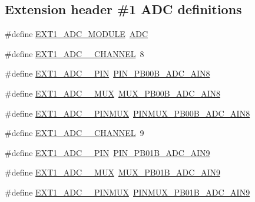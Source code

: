 \subsection*{Extension header \#1 A\+DC definitions}
\begin{DoxyCompactItemize}
\item 
\#define \mbox{\hyperlink{group__samd21__xplained__pro__features__group_gab83ec879d6e7b5c444f1040cc66f6dee}{E\+X\+T1\+\_\+\+A\+D\+C\+\_\+\+M\+O\+D\+U\+LE}}~\mbox{\hyperlink{group___s_a_m_d21_j18_a__base_ga54d148b91f3d356713f7e367a2243bea}{A\+DC}}
\item 
\#define \mbox{\hyperlink{group__samd21__xplained__pro__features__group_ga7284b60a75f2e7da244ab23febb69ddc}{E\+X\+T1\+\_\+\+A\+D\+C\+\_\+\_\+\+C\+H\+A\+N\+N\+EL}}~8
\item 
\#define \mbox{\hyperlink{group__samd21__xplained__pro__features__group_ga646da6c87a60fb8f8961f877ce858f43}{E\+X\+T1\+\_\+\+A\+D\+C\+\_\+\_\+\+P\+IN}}~\mbox{\hyperlink{pio_2samd21j18a_8h_a908a9cac08dea9a27ed599cc49b6a93e}{P\+I\+N\+\_\+\+P\+B00\+B\+\_\+\+A\+D\+C\+\_\+\+A\+I\+N8}}
\item 
\#define \mbox{\hyperlink{group__samd21__xplained__pro__features__group_gabdc6ba9937a1050b8a40f8928d95fbc4}{E\+X\+T1\+\_\+\+A\+D\+C\+\_\+\_\+\+M\+UX}}~\mbox{\hyperlink{pio_2samd21j18a_8h_a71de17af729c0317dacad0605aed38b7}{M\+U\+X\+\_\+\+P\+B00\+B\+\_\+\+A\+D\+C\+\_\+\+A\+I\+N8}}
\item 
\#define \mbox{\hyperlink{group__samd21__xplained__pro__features__group_ga1724086d943789b79674a86857cb0fae}{E\+X\+T1\+\_\+\+A\+D\+C\+\_\+\_\+\+P\+I\+N\+M\+UX}}~\mbox{\hyperlink{pio_2samd21j18a_8h_ac5281f3a452f510af8a361c29b71a9f4}{P\+I\+N\+M\+U\+X\+\_\+\+P\+B00\+B\+\_\+\+A\+D\+C\+\_\+\+A\+I\+N8}}
\item 
\#define \mbox{\hyperlink{group__samd21__xplained__pro__features__group_gab417a7e533603c8f6cef45a8f669895b}{E\+X\+T1\+\_\+\+A\+D\+C\+\_\+\_\+\+C\+H\+A\+N\+N\+EL}}~9
\item 
\#define \mbox{\hyperlink{group__samd21__xplained__pro__features__group_ga5e8abff0e74e67c2a3ca1ac50fb8143c}{E\+X\+T1\+\_\+\+A\+D\+C\+\_\+\_\+\+P\+IN}}~\mbox{\hyperlink{pio_2samd21j18a_8h_a37f7297314e6c7f2be1baa9467d731ce}{P\+I\+N\+\_\+\+P\+B01\+B\+\_\+\+A\+D\+C\+\_\+\+A\+I\+N9}}
\item 
\#define \mbox{\hyperlink{group__samd21__xplained__pro__features__group_ga0648d769904c7a9867b8abe8190f24c2}{E\+X\+T1\+\_\+\+A\+D\+C\+\_\+\_\+\+M\+UX}}~\mbox{\hyperlink{pio_2samd21j18a_8h_a531347417487ac40cc186034583a5920}{M\+U\+X\+\_\+\+P\+B01\+B\+\_\+\+A\+D\+C\+\_\+\+A\+I\+N9}}
\item 
\#define \mbox{\hyperlink{group__samd21__xplained__pro__features__group_ga978881ce8407376203dd96a97788651d}{E\+X\+T1\+\_\+\+A\+D\+C\+\_\+\_\+\+P\+I\+N\+M\+UX}}~\mbox{\hyperlink{pio_2samd21j18a_8h_a75deb20e2c761ad705cb2d9ed32e222c}{P\+I\+N\+M\+U\+X\+\_\+\+P\+B01\+B\+\_\+\+A\+D\+C\+\_\+\+A\+I\+N9}}
\end{DoxyCompactItemize}
